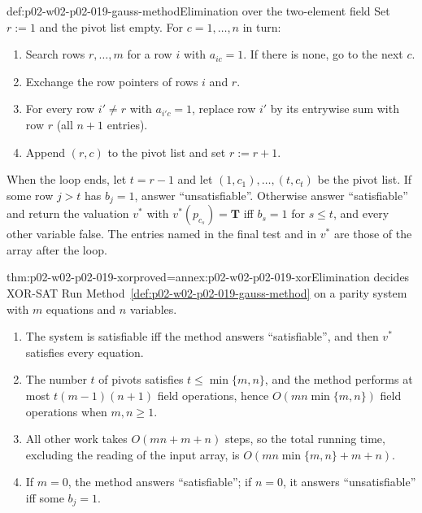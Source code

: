 \begin{hbmethod}{def:p02-w02-p02-019-gauss-method}{Elimination over the two-element field}
Set \(r:=1\) and the pivot list empty.  For \(c=1,\ldots,n\) in turn:
\begin{enumerate}
  \item Search rows \(r,\ldots,m\) for a row \(i\) with \(a_{ic}=1\).  If
        there is none, go to the next \(c\).
  \item Exchange the row pointers of rows \(i\) and \(r\).
  \item For every row \(i'\neq r\) with \(a_{i'c}=1\), replace row \(i'\)
        by its entrywise sum with row \(r\) (all \(n+1\) entries).
  \item Append \((r,c)\) to the pivot list and set \(r:=r+1\).
\end{enumerate}
When the loop ends, let \(t=r-1\) and let \((1,c_1),\ldots,(t,c_t)\) be the
pivot list.  If some row \(j>t\) has \(b_j=1\), answer ``unsatisfiable''.
Otherwise answer ``satisfiable'' and return the valuation \(v^{*}\) with
\(v^{*}(p_{c_s})=\mathbf{T}\) iff \(b_s=1\) for \(s\leq t\), and every other
variable false.  The entries named in the final test and in \(v^{*}\) are
those of the array after the loop.
\end{hbmethod}

\begin{hbtheorem}{thm:p02-w02-p02-019-xor}{proved=annex:p02-w02-p02-019-xor}{Elimination decides XOR-SAT}
Run Method~\ref{def:p02-w02-p02-019-gauss-method} on a parity system with
\(m\) equations and \(n\) variables.
\begin{enumerate}
  \item The system is satisfiable iff the method answers ``satisfiable'', and
        then \(v^{*}\) satisfies every equation.
  \item The number \(t\) of pivots satisfies \(t\leq\min\{m,n\}\), and the
        method performs at most \(t(m-1)(n+1)\) field operations, hence
        \(O(mn\min\{m,n\})\) field operations when \(m,n\geq 1\).
  \item All other work takes \(O(mn+m+n)\) steps, so the total running time,
        excluding the reading of the input array, is
        \(O(mn\min\{m,n\}+m+n)\).
  \item If \(m=0\), the method answers ``satisfiable''; if \(n=0\), it
        answers ``unsatisfiable'' iff some \(b_j=1\).
\end{enumerate}
\end{hbtheorem}

